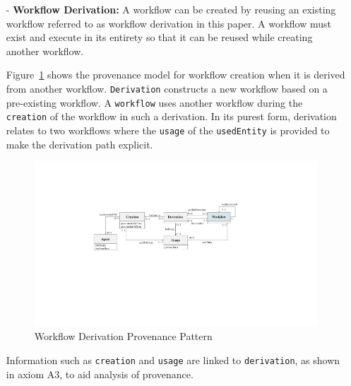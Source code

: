 \documentclass[ao]{iosart2x}
\begin{document}
\begin{itemize}
\item[-]\textbf{Workflow Derivation:} A workflow can be created by reusing an existing workflow referred to as workflow derivation in this paper. %
A workflow must exist and execute in its entirety so that it can be reused while creating another workflow. 

Figure~\ref{fig:workflow-reuse-provenance} shows the provenance model for workflow creation when it is derived from another workflow. \texttt{Derivation} constructs a new workflow based on a pre-existing workflow.
A \texttt{workflow} uses another workflow during the \texttt{creation} of the workflow in such a derivation.
In its purest form, derivation relates to two workflows where the \texttt{usage} of the \texttt{usedEntity} is provided to make the derivation path explicit.  

\begin{figure}[h]
    \centering
    \includegraphics[width=0.85\linewidth]{figures/workflow-reuse-pattern.pdf}
    \caption{Workflow Derivation Provenance Pattern}
    \label{fig:workflow-reuse-provenance}
\end{figure}

Information such as \texttt{creation} and \texttt{usage} are linked to \texttt{derivation}, as shown in axiom A3, to aid analysis of provenance.


\end{itemize}
\end{document}
